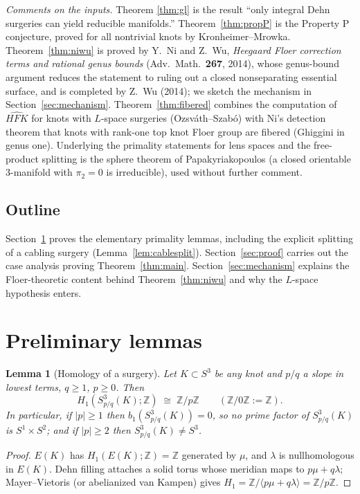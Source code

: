 \documentclass[11pt]{article}
\newtheorem{lemma}[theorem]{Lemma}
\theoremstyle{definition}
\theoremstyle{remark}
\newcommand{\HFK}{\widehat{HFK}}
\newcommand{\Z}{\mathbb{Z}}
\begin{document}
\noindent\emph{Comments on the inputs.}  Theorem \ref{thm:gl} is the result
``only integral Dehn surgeries can yield reducible manifolds.''
Theorem~\ref{thm:propP} is the Property P conjecture, proved for all
nontrivial knots by Kronheimer--Mrowka.  Theorem~\ref{thm:niwu} is proved by
Y.~Ni and Z.~Wu, \emph{Heegaard Floer correction terms and rational genus
bounds} (Adv.~Math.~\textbf{267}, 2014), whose genus-bound argument reduces
the statement to ruling out a closed nonseparating essential surface, and is
completed by Z.~Wu (2014); we sketch the mechanism in
Section~\ref{sec:mechanism}.  Theorem~\ref{thm:fibered} combines the
computation of $\HFK$ for knots with $L$-space surgeries
(Ozsv\'ath--Szab\'o) with Ni's detection theorem that knots with rank-one top
knot Floer group are fibered (Ghiggini in genus one).
Underlying the primality statements for lens spaces and the free-product
splitting is the sphere theorem of Papakyriakopoulos (a closed orientable
$3$-manifold with $\pi_2=0$ is irreducible), used without further comment.

\subsection{Outline}

Section~\ref{sec:prelim} proves the elementary primality lemmas, including the
explicit splitting of a cabling surgery (Lemma~\ref{lem:cablesplit}).
Section~\ref{sec:proof} carries out the case analysis proving
Theorem~\ref{thm:main}.  Section~\ref{sec:mechanism} explains the Floer-theoretic
content behind Theorem~\ref{thm:niwu} and why the $L$-space hypothesis enters.

\section{Preliminary lemmas}\label{sec:prelim}

\begin{lemma}[Homology of a surgery]\label{lem:homology}
Let $K\subset S^3$ be any knot and $p/q$ a slope in lowest terms, $q\ge 1$,
$p\ge 0$.  Then
\[
H_1(S^3_{p/q}(K);\Z)\;\cong\;\Z/p\Z
\qquad(\Z/0\Z:=\Z).
\]
In particular, if $|p|\ge 1$ then $b_1(S^3_{p/q}(K))=0$, so no prime factor
of $S^3_{p/q}(K)$ is $S^1\times S^2$; and if $|p|\ge 2$ then
$S^3_{p/q}(K)\neq S^3$.
\end{lemma}

\begin{proof}
$E(K)$ has $H_1(E(K);\Z)=\Z$ generated by $\mu$, and $\lambda$ is
nullhomologous in $E(K)$.  Dehn filling attaches a solid torus whose meridian
maps to $p\mu+q\lambda$; Mayer--Vietoris (or abelianized van Kampen) gives
$H_1=\Z/\langle p\mu+q\lambda\rangle=\Z/p\Z$.
\end{proof}
\end{document}
